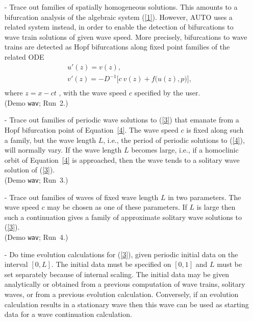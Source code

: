 \documentclass[12pt]{report}
\begin{document}
\begin{itemize}
\item[-]
  Trace out families of spatially homogeneous solutions.
  This amounts to a bifurcation analysis of the algebraic
  system (\ref{1}). However, {\cal AUTO} uses a related system instead,
  in order to enable the detection of bifurcations to wave train
  solutions of given wave speed. More precisely, bifurcations
  to wave trains are detected as Hopf bifurcations along fixed
  point families of the related ODE
  \begin{equation} \label{4} \begin{array}{cl}
  & u'(z) = v(z) ,\\
  & v'(z) =-D^{-1}  \bigl[ c~v(z) + f\bigl( u(z) , p \bigr) \bigr], \\
  \end{array} \end{equation}
  where $z = x - ct$ , with the wave speed $c$ specified by the user.\\
  (Demo {\tt wav}; Run~2.) 
\item[-]
  Trace out families of periodic wave solutions to (\ref{3}) that emanate
  from a Hopf bifurcation point of Equation~\ref{4}.
  The wave speed $c$ is  fixed along such a family, but
  the wave length $L$, i.e., the period of periodic solutions 
  to (\ref{4}),
  will normally vary. If the wave length $L$ becomes large,
  i.e., if a homoclinic orbit of Equation~\ref{4} is approached,
  then the wave tends to a solitary wave solution of (\ref{3}). \\
  (Demo {\tt wav}; Run~3.) 
\item[-]
  Trace out families of waves of fixed wave length $L$ in two parameters. 
  The wave speed $c$ may be chosen as one of these parameters.
  If $L$ is large then such a continuation gives a family
  of approximate solitary wave solutions to (\ref{3}).\\
  (Demo {\tt wav}; Run~4.) 
\item[-]
  Do time evolution calculations for (\ref{3}), given periodic
  initial data on the interval $[0,L]$.
  The initial data must be specified on $[0,1]$ and
  $L$ must be set separately because of internal scaling.
  The initial data may be given analytically or
  obtained from a previous computation of wave trains, solitary
  waves, or from a previous evolution calculation.
  Conversely, if an evolution calculation results in a
  stationary wave then this wave can be used as starting data
  for a wave continuation calculation.\\

\end{itemize}
\end{document}
